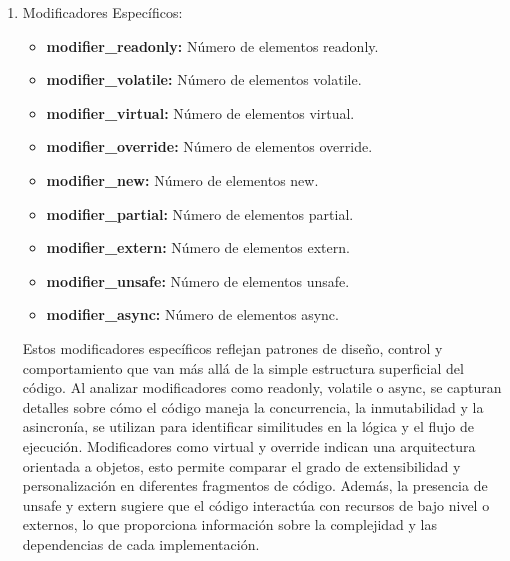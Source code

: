 \begin{enumerate}
    \item Modificadores Específicos:
    \begin{itemize}
        \item {\bf modifier\_readonly:} Número de elementos readonly.
        \item {\bf modifier\_volatile:} Número de elementos volatile.
        \item {\bf modifier\_virtual:} Número de elementos virtual.
        \item {\bf modifier\_override:} Número de elementos override.
        \item {\bf modifier\_new:} Número de elementos new.
        \item {\bf modifier\_partial:} Número de elementos partial.
        \item {\bf modifier\_extern:} Número de elementos extern.
        \item {\bf modifier\_unsafe:} Número de elementos unsafe.
        \item {\bf modifier\_async:} Número de elementos async.
    \end{itemize}
    
    Estos modificadores específicos reflejan patrones de diseño, control y comportamiento que van más allá de la simple estructura superficial del código. Al analizar modificadores como readonly, volatile o async, se capturan detalles sobre cómo el código maneja la concurrencia, la inmutabilidad y la asincronía, se utilizan para identificar similitudes en la lógica y el flujo de ejecución. Modificadores como virtual y override indican una arquitectura orientada a objetos, esto permite comparar el grado de extensibilidad y personalización en diferentes fragmentos de código. Además, la presencia de unsafe y extern sugiere que el código interactúa con recursos de bajo nivel o externos, lo que proporciona información sobre la complejidad y las dependencias de cada implementación.\\


\end{enumerate}
